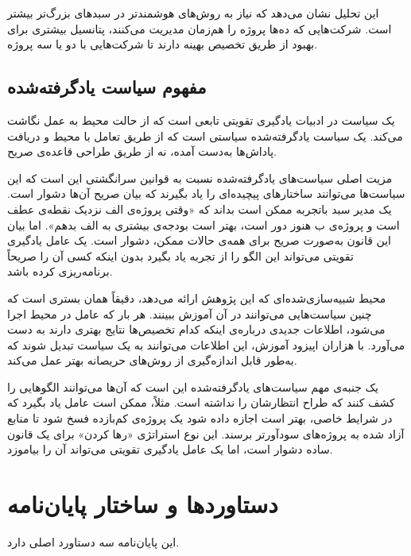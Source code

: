 این تحلیل نشان می‌دهد که نیاز به روش‌های هوشمندتر در سبدهای
بزرگ‌تر بیشتر است. شرکت‌هایی که ده‌ها پروژه را هم‌زمان مدیریت
می‌کنند، پتانسیل بیشتری برای بهبود از طریق تخصیص بهینه دارند
تا شرکت‌هایی با دو یا سه پروژه.

\subsection{مفهوم سیاست یادگرفته‌شده}
\label{subsec:learned_policy_concept}

یک سیاست در ادبیات یادگیری تقویتی تابعی است که از حالت محیط به
عمل نگاشت می‌کند. یک سیاست یادگرفته‌شده سیاستی است که از طریق
تعامل با محیط و دریافت پاداش‌ها به‌دست آمده، نه از طریق طراحی
قاعده‌ی صریح.

مزیت اصلی سیاست‌های یادگرفته‌شده نسبت به قوانین سرانگشتی این
است که این سیاست‌ها می‌توانند ساختارهای پیچیده‌ای را یاد بگیرند
که بیان صریح آن‌ها دشوار است. یک مدیر سبد باتجربه ممکن است
بداند که «وقتی پروژه‌ی الف نزدیک نقطه‌ی عطف است و پروژه‌ی ب
هنوز دور است، بهتر است بودجه‌ی بیشتری به الف بدهم». اما بیان
این قانون به‌صورت صریح برای همه‌ی حالات ممکن، دشوار است. یک
عامل یادگیری تقویتی می‌تواند این الگو را از تجربه یاد بگیرد
بدون اینکه کسی آن را صریحاً برنامه‌ریزی کرده باشد.

محیط شبیه‌سازی‌شده‌ای که این پژوهش ارائه می‌دهد، دقیقاً همان بستری
است که چنین سیاست‌هایی می‌توانند در آن آموزش ببینند. هر بار که
عامل در محیط اجرا می‌شود، اطلاعات جدیدی درباره‌ی اینکه کدام
تخصیص‌ها نتایج بهتری دارند به دست می‌آورد. با هزاران اپیزود
آموزش، این اطلاعات می‌توانند به یک سیاست تبدیل شوند که به‌طور
قابل اندازه‌گیری از روش‌های حریصانه بهتر عمل می‌کند.

یک جنبه‌ی مهم سیاست‌های یادگرفته‌شده این است که آن‌ها می‌توانند
الگوهایی را کشف کنند که طراح انتظارشان را نداشته است. مثلاً،
ممکن است عامل یاد بگیرد که در شرایط خاصی، بهتر است اجازه داده
شود یک پروژه‌ی کم‌بازده فسخ شود تا منابع آزاد شده به پروژه‌های
سودآورتر برسند. این نوع استراتژی «رها کردن» برای یک قانون ساده
دشوار است، اما یک عامل یادگیری تقویتی می‌تواند آن را بیاموزد.

\section{دستاوردها و ساختار پایان‌نامه}
\label{sec:organisation}

این پایان‌نامه سه دستاورد اصلی دارد.

